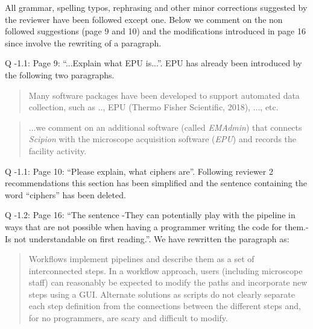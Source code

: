 \documentclass[a4paper,12pt]{article}
\def\scipion{\textit{Scipion}\xspace}
\def\emadmin{\textit{EMAdmin}\xspace}
\def\epu{\textit{EPU}\xspace}
\begin{document}
\begin{reviewer}

\reply All grammar, spelling typos, rephrasing and other minor corrections suggested by the reviewer have been followed except one. Below we comment on the non followed suggestions (page 9 and 10) and the modifications introduced in page 16 since involve the rewriting of a paragraph. 

Q \the\numexpr\value{pointcounter}-1\relax.1: Page 9: ``...Explain what EPU is...''. EPU has already been introduced by the following two paragraphs.

\begin{quote}
 Many software packages have been developed to support automated data collection, such as 
 .., EPU (Thermo Fisher Scientific, 2018), ..., etc.
\end{quote}

\begin{quote}
...we comment on an additional software (called  \emadmin) that connects \scipion with the microscope acquisition software (\epu) and records the facility activity.
\end{quote}

Q \the\numexpr\value{pointcounter}-1\relax.1: Page 10: ``Please explain, what ciphers are''. Following reviewer 2 recommendations this section has been simplified and the sentence containing the word ``ciphers'' has been deleted. 

Q \the\numexpr\value{pointcounter}-1\relax.2: Page 16: ``The sentence -They can potentially play with the pipeline in ways that are not possible when having a programmer writing the code for them.- Is not understandable on first reading.''. We have rewritten the paragraph as:


\begin{quote}
 Workflows implement pipelines and describe them as a set of interconnected steps. In a workflow approach, users (including microscope staff) can reasonably be expected to modify the paths and incorporate new steps using a GUI. Alternate solutions as scripts do not clearly separate each step definition from the connections between the different steps and, for no programmers, are scary and difficult to modify. 
\end{quote}

\end{reviewer}
\end{document}
